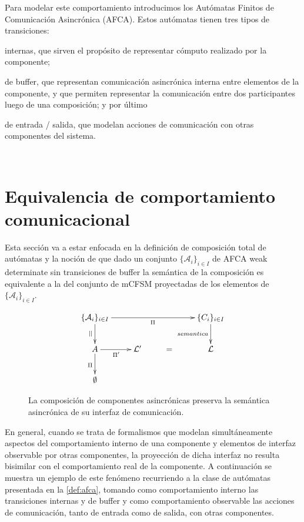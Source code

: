 Para modelar este comportamiento introducimos los Autómatas Finitos de Comunicación Asincrónica (AFCA). Estos autómatas tienen tres tipos de transiciones: 
\begin{inparaenum}[1)]
\item internas, que sirven el propósito de representar cómputo realizado por la componente; 
\item de buffer, que representan comunicación asincrónica interna entre elementos de la componente, y que permiten representar la comunicación entre dos participantes luego de una composición; y por último 
\item de entrada / salida, que modelan acciones de comunicación con otras componentes del sistema.
\end{inparaenum} \\

\section{Equivalencia de comportamiento comunicacional}
Esta sección va a estar enfocada en la definición de composición total de autómatas y la noción de que dado un conjunto $\{ \mathcal{A}_i\}_{i \in I}$ de AFCA weak determinate sin transiciones de buffer la semántica de la composición es equivalente a la del conjunto de mCFSM proyectadas de los elementos de $\{ \mathcal{A}_i\}_{i \in I}$. 

\begin{figure}[ht]
$$
\xymatrix{   
	\{\mathcal{A}_i\}_{i \in I} \ar[rrr]_{\Pi} \ar[d]_{||} & & & \{C_i\}_{i \in I}  \ar[d]_{semantica}  \\
	  {A} \ar[r]_{\Pi'} \ar[d]_{\Pi} & \mathcal{L}' & = & {\mathcal{L}}  \\
	  \emptyset
}
$$
\caption{La composición de componentes asincrónicas preserva la semántica asincrónica de su interfaz de comunicación.}
\label{fig:preservacion}
\end{figure}

En general, cuando se trata de formalismos que modelan simultáneamente aspectos del comportamiento interno de una componente y elementos de interfaz observable por otras componentes, la proyección de dicha interfaz no resulta bisimilar con el comportamiento real de la componente. A continuación se muestra un ejemplo de este fenómeno recurriendo a la clase de autómatas presentada en la \ref{def:afca}, tomando como comportamiento interno las transiciones internas y de buffer y como comportamiento observable las acciones de comunicación, tanto de entrada como de salida, con otras componentes.


